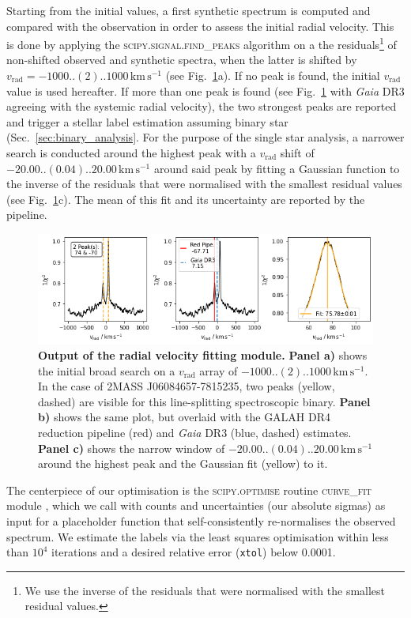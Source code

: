 \documentclass[
  journal=pasa,
  manuscript=research-paper, %
  year=2023,
  volume=37
]{cup-journal}
\newcommand{\vrad}{$v_\mathrm{rad}$\xspace}
\newcommand{\Gaia}{\textit{Gaia}\xspace}
\newcommand{\kms}{\,\mathrm{km\,s^{-1}}}	%
\begin{document}
Starting from the initial values, a first synthetic spectrum is computed and compared with the observation in order to assess the initial radial velocity. This is done by applying the \textsc{scipy.signal.find\_peaks} algorithm on a the residuals\footnote{We use the inverse of the residuals that were normalised with the smallest residual values.} of non-shifted observed and synthetic spectra, when the latter is shifted by $v_\text{rad} = -1000..(2)..1000\kms$ (see Fig.~\ref{fig:181221003101356_single_fit_rv}a). If no peak is found, the initial \vrad value is used hereafter. If more than one peak is found (see Fig.~\ref{fig:181221003101356_single_fit_rv} with \Gaia DR3 agreeing with the systemic radial velocity), the two strongest peaks are reported and trigger a stellar label estimation assuming binary star (Sec.~\ref{sec:binary_analysis}. For the purpose of the single star analysis, a narrower search is conducted around the highest peak with a \vrad shift of $-20.00..(0.04)..20.00\kms$ around said peak by fitting a Gaussian function to the inverse of the residuals that were normalised with the smallest residual values (see Fig.~\ref{fig:181221003101356_single_fit_rv}c). The mean of this fit and its uncertainty are reported by the pipeline.

\begin{figure}[hbt]
\centering
\includegraphics[width=\textwidth]{figures/181221003101356_single_fit_rv.png}
\caption{\textbf{Output of the radial velocity fitting module.} \textbf{Panel a)} shows the initial broad search on a \vrad array of $-1000..(2)..1000\kms$. In the case of 2MASS J06084657-7815235, two peaks (yellow, dashed) are visible for this line-splitting spectroscopic binary. \textbf{Panel b)} shows the same plot, but overlaid with the GALAH DR4 reduction pipeline (red) and \Gaia DR3 (blue, dashed) estimates. \textbf{Panel c)} shows the narrow window of $-20.00..(0.04)..20.00\kms$ around the highest peak and the Gaussian fit (yellow) to it.}
\label{fig:181221003101356_single_fit_rv}
\end{figure}

The centerpiece of our optimisation is the \textsc{scipy.optimise} routine \textsc{curve\_fit} module \citep{scipy}, which we call with counts and uncertainties (our absolute sigmas) as input for a placeholder function that self-consistently re-normalises the observed spectrum. We estimate the labels via the least squares optimisation within less than $10^4$ iterations and a desired relative error (\texttt{xtol}) below 0.0001.
\end{document}
